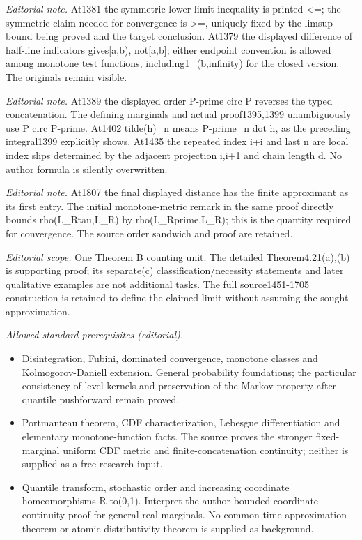 \documentclass[10pt,a4paper]{article}
\theoremstyle{plain}
\theoremstyle{definition}
\begin{document}
\noindent\textit{Editorial note.} At1381 the symmetric lower-limit inequality is printed <=; the symmetric claim needed for convergence is >=, uniquely fixed by the limsup bound being proved and the target conclusion. At1379 the displayed difference of half-line indicators gives[a,b), not[a,b]; either endpoint convention is allowed among monotone test functions, including1\_(b,infinity) for the closed version. The originals remain visible.\par\medskip
\noindent\textit{Editorial note.} At1389 the displayed order P-prime circ P reverses the typed concatenation. The defining marginals and actual proof1395,1399 unambiguously use P circ P-prime. At1402 tilde(h)\_n means P-prime\_n dot h, as the preceding integral1399 explicitly shows. At1435 the repeated index i+i and last n are local index slips determined by the adjacent projection i,i+1 and chain length d. No author formula is silently overwritten.\par\medskip
\noindent\textit{Editorial note.} At1807 the final displayed distance has the finite approximant as its first entry. The initial monotone-metric remark in the same proof directly bounds rho(L\_Rtau,L\_R) by rho(L\_Rprime,L\_R); this is the quantity required for convergence. The source order sandwich and proof are retained.\par\medskip
\noindent\textit{Editorial scope.} One Theorem B counting unit. The detailed Theorem4.21(a),(b) is supporting proof; its separate(c) classification/necessity statements and later qualitative examples are not additional tasks. The full source1451-1705 construction is retained to define the claimed limit without assuming the sought approximation.\par\medskip
\noindent\textit{Allowed standard prerequisites (editorial).}\begin{itemize}
\item Disintegration, Fubini, dominated convergence, monotone classes and Kolmogorov-Daniell extension. General probability foundations; the particular consistency of level kernels and preservation of the Markov property after quantile pushforward remain proved.
\item Portmanteau theorem, CDF characterization, Lebesgue differentiation and elementary monotone-function facts. The source proves the stronger fixed-marginal uniform CDF metric and finite-concatenation continuity; neither is supplied as a free research input.
\item Quantile transform, stochastic order and increasing coordinate homeomorphisms R to(0,1). Interpret the author bounded-coordinate continuity proof for general real marginals. No common-time approximation theorem or atomic distributivity theorem is supplied as background.
\end{itemize}\medskip
\end{document}
